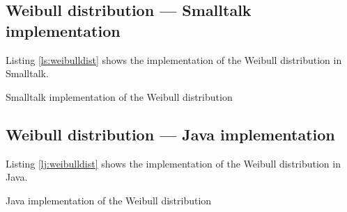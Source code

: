 \documentclass[twoside]{book}
\begin{document}
\subsection{Weibull distribution --- Smalltalk  implementation}
\label{sec:weibull} Listing \ref{ls:weibulldist} shows the
implementation of the Weibull distribution in Smalltalk.

\begin{listing} Smalltalk implementation of the Weibull distribution \label{ls:weibulldist}

\end{listing}

\subsection{Weibull distribution --- Java  implementation}
Listing \ref{lj:weibulldist} shows the implementation of the
Weibull distribution in Java.

\begin{listing} Java implementation of the Weibull distribution \label{lj:weibulldist}

\end{listing}


\ifx\wholebook\relax\else
\end{document}
